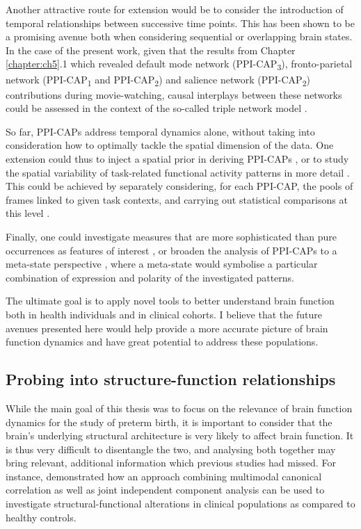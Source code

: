 Another attractive route for extension would be to consider the introduction of temporal relationships between successive time points. This has been shown to be a promising avenue both when considering sequential \citep{Eavani2013,Chen2016, Vidaurre2017} or overlapping \citep{Sourty2016, Bolton2018a} brain states. In the case of the present work, given that the results from Chapter \ref{chapter:ch5}.1 which revealed default mode network (PPI-CAP\textsubscript{3}), fronto-parietal network (PPI-CAP\textsubscript{1} and PPI-CAP\textsubscript{2}) and salience network (PPI-CAP\textsubscript{2}) contributions during movie-watching, causal interplays between these networks could be assessed in the context of the so-called triple network model \citep{Menon2011}. 

So far, PPI-CAPs address temporal dynamics alone, without taking into consideration how to optimally tackle the spatial dimension of the data. One extension could thus to inject a spatial prior in deriving PPI-CAPs \citep{Zhuang2018}, or to study the spatial variability of task-related functional activity patterns in more detail \citep{Kiviniemi2011}. This could be achieved by separately considering, for each PPI-CAP, the pools of frames linked to given task contexts, and carrying out statistical comparisons at this level \citep{Amico2014}. 


Finally, one could investigate measures that are more sophisticated than pure occurrences as features of interest \citep{Chen2015, Bolton2020}, or broaden the analysis of PPI-CAPs to a meta-state perspective \citep{Miller2016,Vidaurre2017}, where a meta-state would symbolise a particular combination of expression and polarity of the investigated patterns.

The ultimate goal is to apply novel tools to better understand brain function both in health individuals and in clinical cohorts. I believe that the future avenues presented here would help provide a more accurate picture of brain function dynamics and have great potential to address these populations.


\subsection*{Probing into structure-function relationships}
While the main goal of this thesis was to focus on the relevance of brain function dynamics for the study of preterm birth, it is important to consider that the brain's underlying structural architecture is very likely to affect brain function. It is thus very difficult to disentangle the two, and analysing both together may bring relevant, additional information which previous studies had missed. For instance, \citet{Amico2018} demonstrated how an approach combining multimodal canonical correlation as well as joint independent component analysis can be used to investigate structural-functional alterations in clinical populations as compared to healthy controls.

